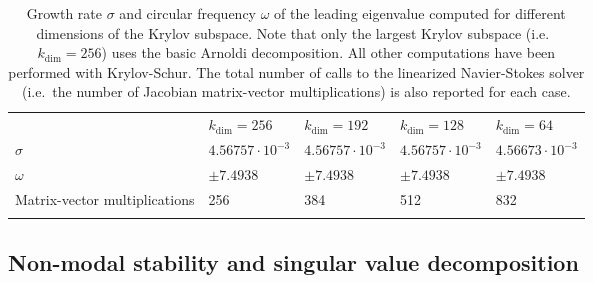     \begin{table}
      \caption{Growth rate $\sigma$ and circular frequency $\omega$ of the leading eigenvalue computed for different dimensions of the Krylov subspace. Note that only the largest Krylov subspace (i.e.\ $k_{\mathrm{dim}}=256$) uses the basic Arnoldi decomposition. All other computations have been performed with Krylov-Schur. The total number of calls to the linearized Navier-Stokes solver (i.e.\ the number of Jacobian matrix-vector multiplications) is also reported for each case.}
      \label{tab: numerics -- linear stability comparison}
      \begin{tabular}{p{2cm}p{2.5cm}p{2.5cm}p{2.5cm}p{2.5cm}}
      \hline\noalign{\smallskip}
       & $k_{\mathrm{dim}} = 256$ & $k_{\mathrm{dim}} = 192$ & $k_{\mathrm{dim}} = 128$ & $k_{\mathrm{dim}} = 64$  \\
      \noalign{\smallskip}\svhline\noalign{\smallskip}
      $\sigma$  & $4.56757 \cdot 10^{-3}$ & $4.56757 \cdot 10^{-3}$ & $4.56757 \cdot 10^{-3}$ & $4.56673 \cdot 10^{-3}$\\
      $\omega$ & $\pm 7.4938$ & $\pm 7.4938$ & $\pm 7.4938$ & $\pm 7.4938$\\
      Matrix-vector multiplications & 256 & 384 & 512 & 832\\
      \noalign{\smallskip}\hline\noalign{\smallskip}
      \end{tabular}
    \end{table}

  \subsection{Non-modal stability and singular value decomposition}

